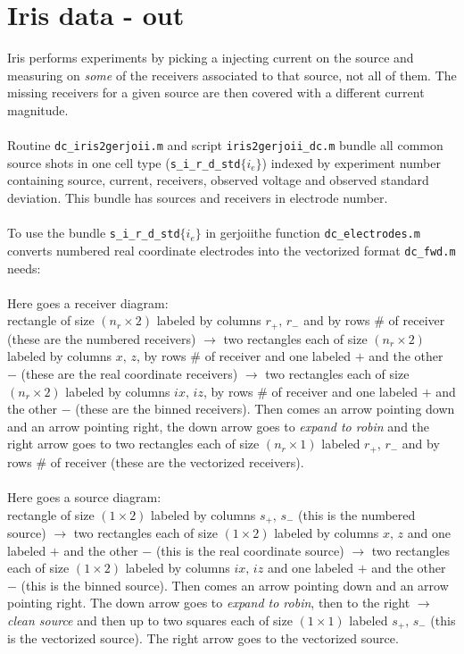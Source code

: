 \documentclass[a4paper,12pt]{article}
\begin{document}
\section{Iris data - out}
Iris performs experiments by picking a injecting current on the source and measuring on {\it some} of the receivers associated to that source, not all of them. The missing receivers for a given source are then covered with a different current magnitude.
\\\\
Routine \texttt{dc\_iris2gerjoii.m} and script \texttt{iris2gerjoii\_dc.m} bundle all common source shots in one cell type (\texttt{s\_i\_r\_d\_std$\{i_e\}$}) indexed by experiment number containing source, current, receivers, observed voltage and observed standard deviation. This bundle has sources and receivers in electrode number.
\\\\
To use the bundle \texttt{s\_i\_r\_d\_std$\{i_e\}$} in \color{nblue}g\color{nred}er\color{ngreen}j\color{nblue}o\color{nred}i\color{moradoAmor}i\color{black}\;the function \texttt{dc\_electrodes.m} converts numbered real coordinate electrodes into the vectorized format \texttt{dc\_fwd.m} needs:
\\\\
Here goes a receiver diagram: \\
rectangle of size $(n_{r}\times 2)$ labeled by columns $r_+,\,r_-$ and by rows $\#$ of receiver (these are the numbered receivers) $\to$ two rectangles each of size $(n_{r}\times 2)$ labeled by columns $x,\,z$, by rows $\#$ of receiver and one labeled $+$ and the other $-$ (these are the real coordinate receivers) $\to$ two rectangles each of size $(n_{r}\times 2)$ labeled by columns $ix,\,iz$, by rows $\#$ of receiver and one labeled $+$ and the other $-$ (these are the binned receivers). Then comes an arrow pointing down and an arrow pointing right, the down arrow goes to {\it expand to robin} and the right arrow goes to two rectangles each of size $(n_{r}\times 1)$ labeled $r_+,\,r_-$ and by rows $\#$ of receiver (these are the vectorized receivers).
\\\\
Here goes a source diagram: \\
rectangle of size $(1\times 2)$ labeled by columns $s_+,\,s_-$ (this is the numbered source) $\to$ two rectangles each of size $(1\times 2)$ labeled by columns $x,\,z$ and one labeled $+$ and the other $-$ (this is the real coordinate source) $\to$ two rectangles each of size $(1\times 2)$ labeled by columns $ix,\,iz$ and one labeled $+$ and the other $-$ (this is the binned source). Then comes an arrow pointing down and an arrow pointing right. The down arrow goes to {\it expand to robin}, then to the right $\to$ {\it clean source} and then up to two squares each of size $(1\times 1)$ labeled $s_+,\,s_-$ (this is the vectorized source). The right arrow goes to the vectorized source.
%
%
%
\end{document}
